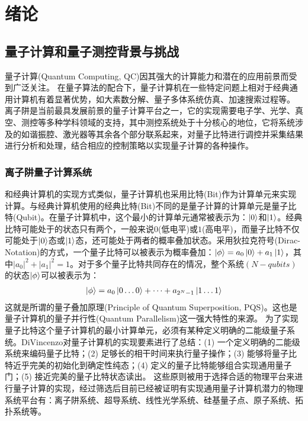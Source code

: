 
\chapter[绪论]{绪论\label{section:introduction}}
\section[离子阱量子测控背景与挑战]{量子计算和量子测控背景与挑战}
量子计算(Quantum Computing, QC)因其强大的计算能力和潜在的应用前景而受到广泛关注。
在量子算法的配合下，量子计算机在一些特定问题上相对于经典通用计算机有着显著优势，如大素数分解\cite[]{Shor_1997, Singleton_Jr_2023}、量子多体系统仿真\cite[]{Feynman_1982, Lloyd_1996}、加速搜索过程\cite[]{Grover_2002}等。
离子阱是当前最具发展前景的量子计算平台之一，它的实现需要电子学、光学、真空、测控等多种学科领域的支持，其中测控系统处于十分核心的地位，它将系统涉及的如谐振腔、激光器等其余各个部分联系起来，对量子比特进行调控并采集结果进行分析和处理，结合相应的控制策略以实现量子计算的各种操作。
\subsection[离子阱量子计算系统]{离子阱量子计算系统}
和经典计算机的实现方式类似，量子计算机也采用比特(Bit)作为计算单元来实现计算。与经典计算机使用的经典比特(Bit)不同的是量子计算的计算单元是量子比特(Qubit)。在量子计算机中，这个最小的计算单元通常被表示为：$\ket{0}$和$\ket{1}$。经典比特可能处于的状态只有两个，一般来说$0$(低电平)或$1$(高电平)，而量子比特不仅可能处于$\ket{0}$态或$\ket{1}$态，还可能处于两者的概率叠加状态。采用狄拉克符号(Dirac-Notation)的方式，一个量子比特可以被表示为概率叠加：$\ket{\phi}=a_0\ket{0}+a_1\ket{1}$，其中$|a_0|^2+|a_1|^2=1$。对于多个量子比特共同存在的情况，整个系统$(N-qubits)$的状态$\ket{\phi}$可以被表示为：
\begin{align}
    \ket{\phi}=a_0\ket{0\dots0}+\dots+a_{2^N-1}\ket{1\dots1}
\end{align}
这就是所谓的量子叠加原理(Principle of Quantum Superposition, PQS)\cite[]{Fedorov_Manko_2019}。这也是量子计算机的量子并行性(Quantum Parallelism)这一强大特性的来源。
为了实现量子比特这个量子计算机的最小计算单元，必须有某种定义明确的二能级量子系统。DiVincenzo对量子计算机的实现要素进行了总结\cite[]{DiVincenzo_2000}：(1) 一个定义明确的二能级系统来编码量子比特；(2) 足够长的相干时间来执行量子操作；(3) 能够将量子比特近乎完美的初始化到确定性纯态；(4) 定义的量子比特能够组合实现通用量子门；(5) 接近完美的量子比特状态读出。
这些原则被用于选择合适的物理平台来进行量子计算的实现，经过筛选后目前已经被证明有实现通用量子计算机潜力的物理系统平台有：离子阱系统、超导系统、线性光学系统、硅基量子点、原子系统、拓扑系统等。

